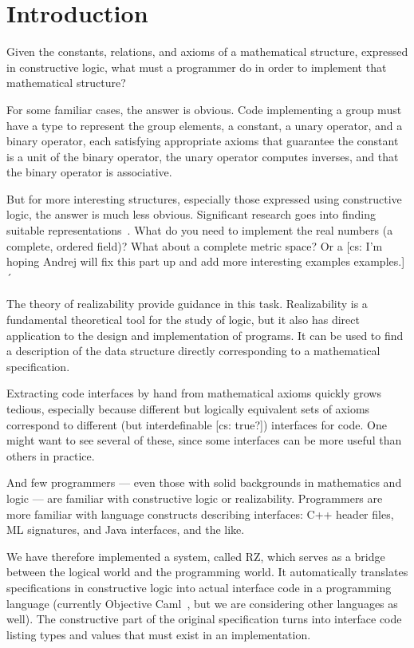 \section{Introduction}
\label{sec:introduction}

Given the constants, relations, and axioms of a mathematical structure,
expressed in constructive logic, what must a programmer do in order to
implement that mathematical structure?

For some familiar cases, the answer is obvious. Code implementing a
group must have a type to represent the group elements, a constant, a
unary operator, and a binary operator, each satisfying appropriate
axioms that guarantee the constant is a unit of the binary operator,
the unary operator computes inverses, and that the binary operator is
associative.

But for more interesting structures, especially those expressed using
constructive logic, the answer is much less obvious. Significant
research goes into finding suitable representations~\cite{???}. What do
you need to implement the real numbers (a complete, ordered field)?
What about a complete metric space? Or a [cs: I'm hoping Andrej will
fix this part up and add more interesting examples examples.]
´
\bigskip

The theory of realizability provide guidance in this task.
Realizability is a fundamental theoretical tool for the study of logic,
but it also has direct application to the design and implementation of
programs. It can be used to find a description of the data structure
directly corresponding to a mathematical specification.

Extracting code interfaces by hand from mathematical axioms quickly
grows tedious, especially because different but logically equivalent
sets of axioms correspond to different (but interdefinable [cs: true?])
interfaces for code. One might want to see several of these, since some
interfaces can be more useful than others in practice.

And few programmers --- even those with solid backgrounds in
mathematics and logic --- are familiar with constructive logic or
realizability. Programmers are more familiar with language constructs describing interfaces:  C++ header files, ML signatures, and
Java interfaces, and the like.

\bigskip

We have therefore implemented a system, called RZ, which serves as a
bridge between the logical world and the programming world. It
automatically translates specifications in constructive logic into
actual interface code in a programming language (currently Objective
Caml~\cite{ocaml}, but we are considering other languages as well). The
constructive part of the original specification turns into interface
code listing types and values that must exist in an implementation.

